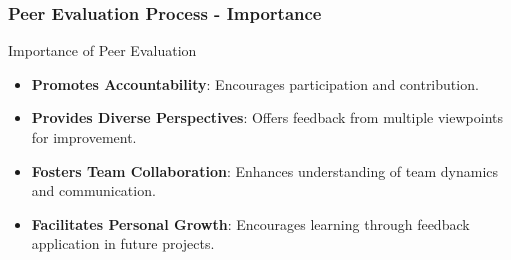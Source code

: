 \documentclass[aspectratio=169]{beamer}
\begin{document}
\begin{frame}[fragile]
    \frametitle{Peer Evaluation Process - Importance}
    \begin{block}{Importance of Peer Evaluation}
        \begin{itemize}
            \item \textbf{Promotes Accountability}: Encourages participation and contribution.
            \item \textbf{Provides Diverse Perspectives}: Offers feedback from multiple viewpoints for improvement.
            \item \textbf{Fosters Team Collaboration}: Enhances understanding of team dynamics and communication.
            \item \textbf{Facilitates Personal Growth}: Encourages learning through feedback application in future projects.
        \end{itemize}
    \end{block}
\end{frame}
\end{document}
